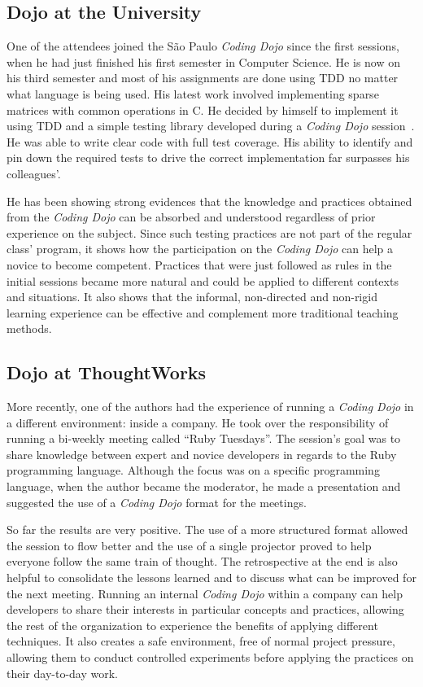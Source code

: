 \subsection{Dojo at the University}

One of the attendees joined the São Paulo \emph{Coding Dojo} since the first sessions,
when he had just finished his first semester in Computer Science. He is now on his third semester
and most of his assignments are done using TDD no matter what language is being used. His latest
work involved implementing sparse matrices with common operations in C. He decided by himself to
implement it using TDD and a simple testing library developed during a \emph{Coding Dojo}
session~\cite{Dojo31}. He was able to write clear code with full test coverage. His ability to
identify and pin down the required tests to drive the correct implementation far surpasses his
colleagues'.

He has been showing strong evidences that the knowledge and practices obtained from the
\emph{Coding Dojo} can be absorbed and understood regardless of prior experience on the
subject. Since such testing practices are not part of the regular class' program, it shows
how the participation on the \emph{Coding Dojo} can help a novice to become competent. Practices
that were just followed as rules in the initial sessions became more natural and could be applied
to different contexts and situations. It also shows that the informal, non-directed and non-rigid
learning experience can be effective and complement more traditional teaching methods.

\subsection{Dojo at ThoughtWorks}

More recently, one of the authors had the experience of running a \emph{Coding Dojo}
in a different environment: inside a company. He took over the responsibility of running a
bi-weekly meeting called ``Ruby Tuesdays''. The session's goal was to share knowledge between
expert and novice developers in regards to the Ruby programming language. Although the focus was on
a specific programming language, when the author became the moderator, he made a presentation
and suggested the use of a \emph{Coding Dojo} format for the meetings.

So far the results are very positive. The use of a more structured format allowed the session to
flow better and the use of a single projector proved to help everyone follow the same train of
thought. The retrospective at the end is also helpful to consolidate the lessons learned and to
discuss what can be improved for the next meeting. Running an internal \emph{Coding Dojo} within
a company can help developers to share their interests in particular concepts and practices, allowing
the rest of the organization to experience the benefits of applying different techniques. It also
creates a safe environment, free of normal project pressure, allowing them to conduct controlled
experiments before applying the practices on their day-to-day work.
